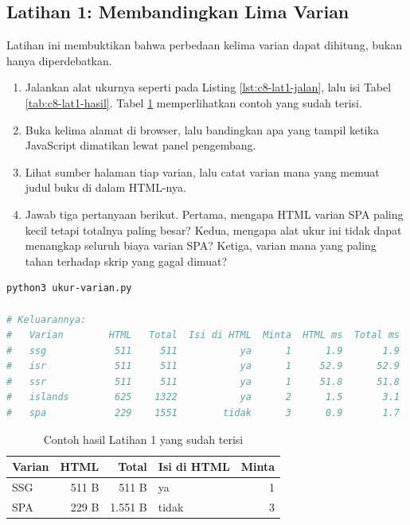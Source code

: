 \subsection*{Latihan 1: Membandingkan Lima Varian}

Latihan ini membuktikan bahwa perbedaan kelima varian dapat dihitung, bukan
hanya diperdebatkan.

\begin{enumerate}
  \item Jalankan alat ukurnya seperti pada Listing \ref{lst:c8-lat1-jalan},
        lalu isi Tabel \ref{tab:c8-lat1-hasil}. Tabel
        \ref{tab:c8-lat1-contoh} memperlihatkan contoh yang sudah terisi.
  \item Buka kelima alamat di browser, lalu bandingkan apa yang tampil
        ketika JavaScript dimatikan lewat panel pengembang.
  \item Lihat sumber halaman tiap varian, lalu catat varian mana yang
        memuat judul buku di dalam HTML-nya.
  \item Jawab tiga pertanyaan berikut. Pertama, mengapa HTML varian SPA
        paling kecil tetapi totalnya paling besar? Kedua, mengapa alat ukur
        ini tidak dapat menangkap seluruh biaya varian SPA? Ketiga, varian
        mana yang paling tahan terhadap skrip yang gagal dimuat?
\end{enumerate}

\begin{lstlisting}[language=bash, caption={Mengukur kelima varian, tersedia di \berkas{sources/chapter08/ukur-varian.py}}, label={lst:c8-lat1-jalan}]
python3 ukur-varian.py

# Keluarannya:
#   Varian        HTML   Total  Isi di HTML  Minta  HTML ms  Total ms
#   ssg            511     511           ya      1      1.9       1.9
#   isr            511     511           ya      1     52.9      52.9
#   ssr            511     511           ya      1     51.8      51.8
#   islands        625    1322           ya      2      1.5       3.1
#   spa            229    1551        tidak      3      0.9       1.7
\end{lstlisting}

\begin{table}[!htb]
  \centering
  \caption{Contoh hasil Latihan 1 yang sudah terisi}
  \label{tab:c8-lat1-contoh}
  \begin{tabularx}{\textwidth}{lrrlr}
    \hline
    \textbf{Varian} & \textbf{HTML} & \textbf{Total} & \textbf{Isi di HTML} & \textbf{Minta} \\
    \hline
    SSG & 511 B & 511 B & ya & 1 \\
    \hline
    SPA & 229 B & 1.551 B & tidak & 3 \\
    \hline
  \end{tabularx}
\end{table}

